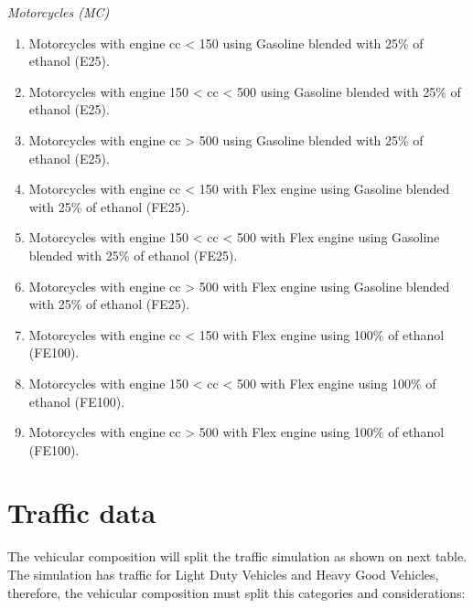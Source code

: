 \documentclass[12pt,graybox,envcountchap,sectrefs]{krantz}
\providecommand{\tightlist}{%
  \setlength{\itemsep}{0pt}\setlength{\parskip}{0pt}}
\theoremstyle{definition}
\theoremstyle{definition}
\theoremstyle{definition}
\theoremstyle{remark}
\begin{document}
\emph{Motorcycles (MC)}

\begin{enumerate}
\def\labelenumi{\arabic{enumi}.}
\tightlist
\item
  Motorcycles with engine cc \textless{} 150 using Gasoline blended with
  25\% of ethanol (E25).
\item
  Motorcycles with engine 150 \textless{} cc \textless{} 500 using
  Gasoline blended with 25\% of ethanol (E25).
\item
  Motorcycles with engine cc \textgreater{} 500 using Gasoline blended
  with 25\% of ethanol (E25).
\item
  Motorcycles with engine cc \textless{} 150 with Flex engine using
  Gasoline blended with 25\% of ethanol (FE25).
\item
  Motorcycles with engine 150 \textless{} cc \textless{} 500 with Flex
  engine using Gasoline blended with 25\% of ethanol (FE25).
\item
  Motorcycles with engine cc \textgreater{} 500 with Flex engine using
  Gasoline blended with 25\% of ethanol (FE25).
\item
  Motorcycles with engine cc \textless{} 150 with Flex engine using
  100\% of ethanol (FE100).
\item
  Motorcycles with engine 150 \textless{} cc \textless{} 500 with Flex
  engine using 100\% of ethanol (FE100).
\item
  Motorcycles with engine cc \textgreater{} 500 with Flex engine using
  100\% of ethanol (FE100).
\end{enumerate}

\section{Traffic data}\label{traffic-data}

The vehicular composition will split the traffic simulation as shown on
next table. The simulation has traffic for Light Duty Vehicles and Heavy
Good Vehicles, therefore, the vehicular composition must split this
categories and considerations:
\end{document}
